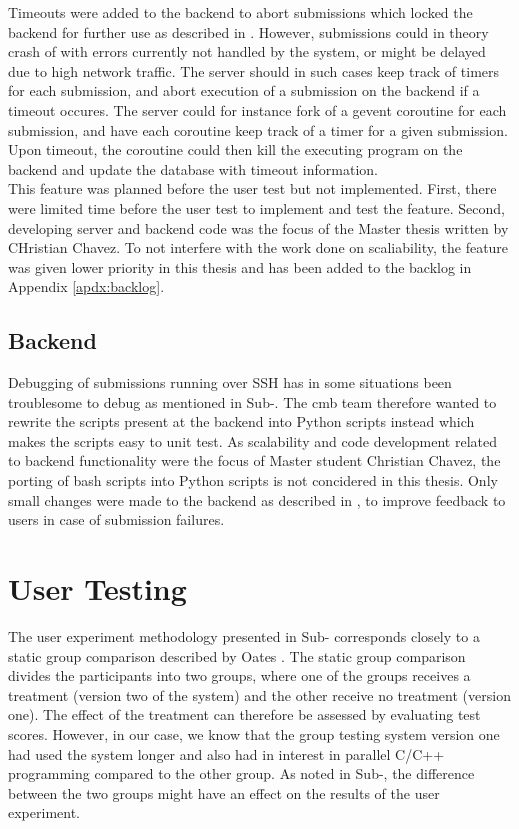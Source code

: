 Timeouts were added to the backend to abort submissions which locked the backend for further use as described in . However, submissions could in theory crash of with errors currently not handled by the system, or might be delayed due to high network traffic. The server should in such cases keep track of timers for each submission, and abort execution of a submission on the backend if a timeout occures. The server could for instance fork of a gevent coroutine for each submission, and have each coroutine keep track of a timer for a given submission. Upon timeout, the coroutine could then kill the executing program on the backend and update the database with timeout information. \\

This feature was planned before the user test but not implemented. First, there were limited time before the user test to implement and test the feature. Second, developing server and backend code was the focus of the Master thesis written by CHristian Chavez. To not interfere with the work done on scaliability, the feature was given lower priority in this thesis and has been added to the backlog in Appendix \ref{apdx:backlog}.

\subsection{Backend}
Debugging of submissions running over SSH has in some situations been troublesome to debug as mentioned in Sub-. The \gls{cmb} team therefore wanted to rewrite the scripts present at the backend into Python scripts instead which makes the scripts easy to unit test. As scalability and code development related to backend functionality were the focus of Master student Christian Chavez, the porting of bash scripts into Python scripts is not concidered in this thesis. Only small changes were made to the backend as described in , to improve feedback to users in case of submission failures.

\section{User Testing}
\label{sec:eval-user-testing}
The user experiment methodology presented in Sub- corresponds closely to a static group comparison described by Oates \cite{Oates2006}. The static group comparison divides the participants into two groups, where one of the groups receives a treatment (version two of the system) and the other receive no treatment (version one). The effect of the treatment can therefore be assessed by evaluating test scores. However, in our case, we know that the group testing system version one had used the system longer and also had in interest in parallel C/C++ programming compared to the other group. As noted in Sub-, the difference between the two groups might have an effect on the results of the user experiment. \\

